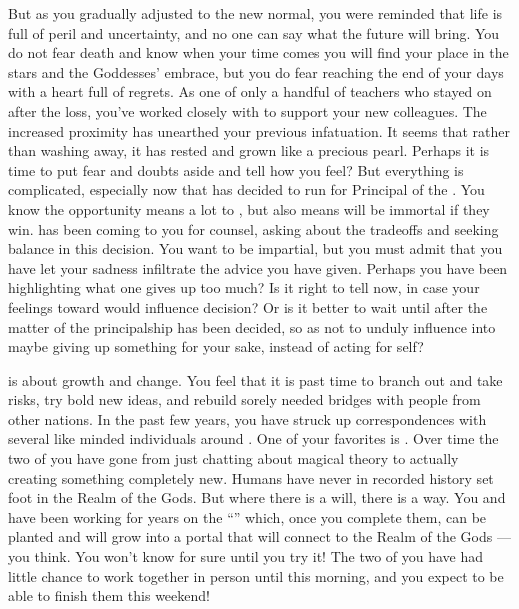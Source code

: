 \documentclass[char]{GL2020}
\begin{document}
But as you gradually adjusted to the new normal, you were reminded that life is full of peril and uncertainty, and no one can say what the future will bring. You do not fear death and know when your time comes you will find your place in the stars and the Goddesses’ embrace, but you do fear reaching the end of your days with a heart full of regrets. As one of only a handful of teachers who stayed on after the loss, you’ve worked closely with \cMusic{} to support your new colleagues. The increased proximity has unearthed your previous infatuation. It seems that rather than washing away, it has rested and grown like a precious pearl. Perhaps it is time to put fear and doubts aside and tell \cMusic{\them} how you feel? But everything is complicated, especially now that \cMusic{} has decided to run for Principal of the \pSchool{}. You know the opportunity means a lot to \cMusic{\them}, but also means \cMusic{\they} will be immortal if they win. \cMusic{} has been coming to you for counsel, asking about the tradeoffs and seeking balance in this decision. You want to be impartial, but you must admit that you have let your sadness infiltrate the advice you have given. Perhaps you have been highlighting what one gives up too much? Is it right to tell \cMusic{} now, in case your feelings toward \cMusic{\them} would influence \cMusic{\their} decision? Or is it better to wait until after the matter of the principalship has been decided, so as not to unduly influence \cMusic{\them} into maybe giving up something for your sake, instead of acting for \cMusic{\them}self?

\cFlow{} is about growth and change. You feel that it is past time to branch out and take risks, try bold new ideas, and rebuild sorely needed bridges with people from other nations. In the past few years, you have struck up correspondences with several like minded individuals around \pEarth{}. One of your favorites is \cCurse{\full}. Over time the two of you have gone from just chatting about magical theory to actually creating something completely new. Humans have never in recorded history set foot in the Realm of the Gods. But where there is a will, there is a way. You and \cCurse{} have been working for years on the ``\iBeansMB{}'' which, once you complete them, can be planted and will grow into a portal that will connect \pEarth{} to the Realm of the Gods — you think. You won't know for sure until you try it! The two of you have had little chance to work together in person until this morning, and you expect to be able to finish them this weekend! 
\end{document}

